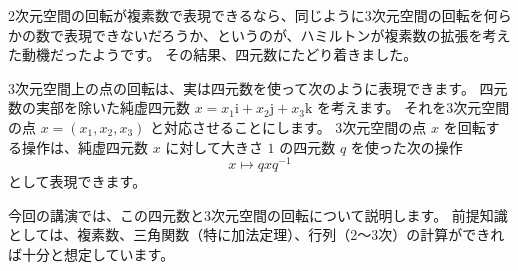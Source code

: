 \documentclass{jlreq}
\newcommand{\ii}{\mathrm{i}}
\newcommand{\jj}{\mathrm{j}}
\newcommand{\kk}{\mathrm{k}}
\begin{document}
2次元空間の回転が複素数で表現できるなら、同じように3次元空間の回転を何らかの数で表現できないだろうか、というのが、ハミルトンが複素数の拡張を考えた動機だったようです。
その結果、四元数にたどり着きました。

3次元空間上の点の回転は、実は四元数を使って次のように表現できます。
四元数の実部を除いた純虚四元数 \(x=x_1\ii+x_2\jj+x_3\kk\) を考えます。
それを3次元空間の点 \(x=(x_1,x_2,x_3)\) と対応させることにします。
3次元空間の点 \(x\) を回転する操作は、純虚四元数 \(x\) に対して大きさ \(1\) の四元数 \(q\) を使った次の操作
\[
    x\mapsto qxq^{-1}
\]
として表現できます。

今回の講演では、この四元数と3次元空間の回転について説明します。
前提知識としては、複素数、三角関数（特に加法定理）、行列（2〜3次）の計算ができれば十分と想定しています。
\end{document}
